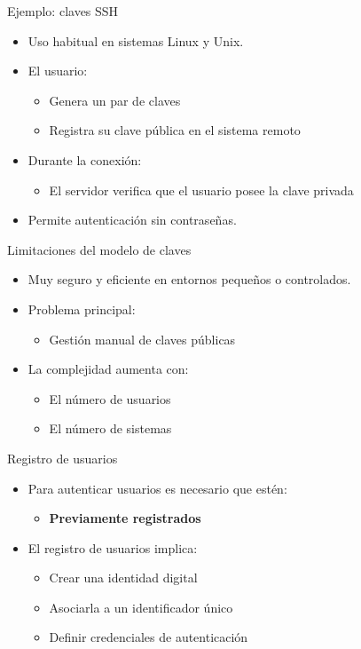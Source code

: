 \documentclass{beamer}
\begin{document}
\begin{frame}{Ejemplo: claves SSH}
\begin{itemize}
  \item Uso habitual en sistemas Linux y Unix.
  \item El usuario:
  \begin{itemize}
    \item Genera un par de claves
    \item Registra su clave pública en el sistema remoto
  \end{itemize}
  \item Durante la conexión:
  \begin{itemize}
    \item El servidor verifica que el usuario posee la clave privada
  \end{itemize}
  \item Permite autenticación sin contraseñas.
\end{itemize}
\end{frame}

\begin{frame}{Limitaciones del modelo de claves}
\begin{itemize}
  \item Muy seguro y eficiente en entornos pequeños o controlados.
  \item Problema principal:
  \begin{itemize}
    \item Gestión manual de claves públicas
  \end{itemize}
  \item La complejidad aumenta con:
  \begin{itemize}
    \item El número de usuarios
    \item El número de sistemas
  \end{itemize}
\end{itemize}
\end{frame}

\begin{frame}{Registro de usuarios}
\begin{itemize}
  \item Para autenticar usuarios es necesario que estén:
  \begin{itemize}
    \item \textbf{Previamente registrados}
  \end{itemize}
  \item El registro de usuarios implica:
  \begin{itemize}
    \item Crear una identidad digital
    \item Asociarla a un identificador único
    \item Definir credenciales de autenticación
  \end{itemize}
\end{itemize}
\end{frame}
\end{document}

